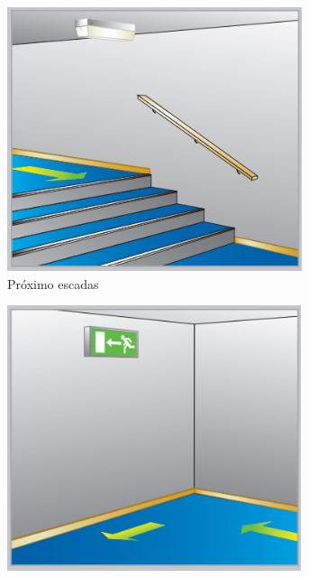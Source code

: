 \begin{figure}[H]
\begin{subfigure}[b]{0.30\textwidth}
			\label{fig: style 1 emergency c}
		\end{subfigure}
		\begin{subfigure}[b]{0.30\textwidth}
			\centering
			\includegraphics[width=\textwidth]{Figures/3. Lighting/light-safety4.jpg}
			\caption{Próximo escadas}
			\label{fig: style 1 emergency d}
		\end{subfigure}
		\hfill
		\begin{subfigure}[b]{0.30\textwidth}
			\centering
			\includegraphics[width=\textwidth]{Figures/3. Lighting/light-safety5.jpg}

\end{subfigure}
\end{figure}
